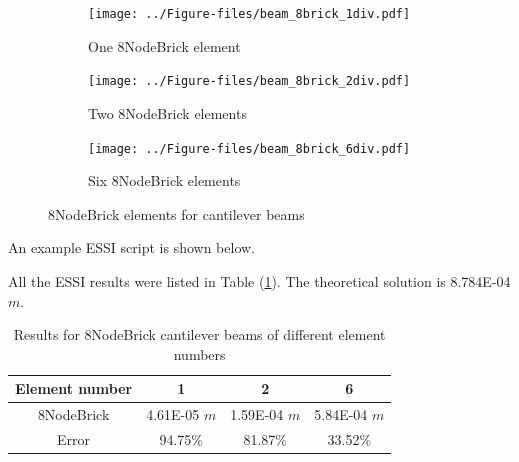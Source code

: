 \documentclass[fleqn,11pt]{article}
\begin{document}
\begin{figure}[H]
  \centering
  \begin{subfigure}{0.5\textwidth}
    \centering
    \texttt{[image: ../Figure-files/beam\_8brick\_1div.pdf]}
    \caption{One 8NodeBrick element}
  \end{subfigure}
  \vskip 8pt
  \begin{subfigure}{0.5\textwidth}
    \centering
    \texttt{[image: ../Figure-files/beam\_8brick\_2div.pdf]}
    \caption{Two 8NodeBrick elements}
  \end{subfigure}
  \vskip 8pt
  \begin{subfigure}{0.5\textwidth}
    \centering
    \texttt{[image: ../Figure-files/beam\_8brick\_6div.pdf]}
    \caption{Six 8NodeBrick elements}
  \end{subfigure}
  \captionsetup{justification=centering,margin=3cm}
  \caption{8NodeBrick elements for cantilever beams}
  \label{fig 8NodeBrick elements for cantilever beams}
\end{figure}






An example ESSI script is shown below.




All the ESSI results were listed in Table (\ref{table 8NodeBrick cantilever beams results for different element number}). 
The theoretical solution is 8.784E-04 $m$.
\begin{table}[H]
  \centering
    \caption{Results for 8NodeBrick cantilever beams of different element numbers}
    \begin{tabular}{|c|c|c|c|}
      \hline
      Element number & 1        & 2        & 6         \\  \hline
      8NodeBrick     & 4.61E-05 $m$ & 1.59E-04 $m$ & 5.84E-04 $m$     \\ \hline
      Error           & 94.75\%  & 81.87\%  & 33.52\%           \\ 
      \hline 
    \end{tabular}
    \label{table 8NodeBrick cantilever beams results for different element number}
\end{table}
\end{document}
